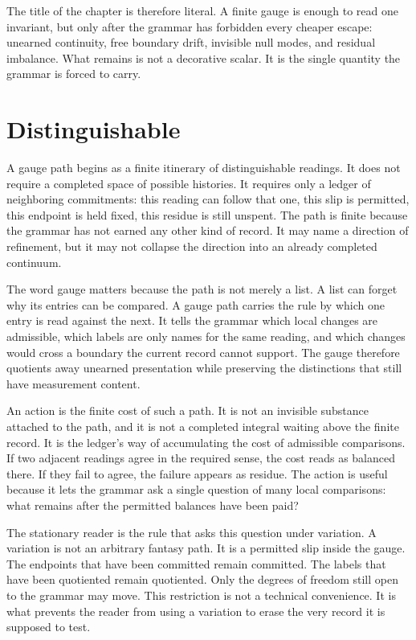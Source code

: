 The title of the chapter is therefore literal. A finite gauge is enough to
read one invariant, but only after the grammar has forbidden every cheaper
escape: unearned continuity, free boundary drift, invisible null modes, and
residual imbalance. What remains is not a decorative scalar. It is the
single quantity the grammar is forced to carry.

\section{Distinguishable}

A gauge path begins as a finite itinerary of distinguishable readings. It
does not require a completed space of possible histories. It requires only a
ledger of neighboring commitments: this reading can follow that one, this
slip is permitted, this endpoint is held fixed, this residue is still
unspent. The path is finite because the grammar has not earned any other
kind of record. It may name a direction of refinement, but it may not
collapse the direction into an already completed continuum.

The word gauge matters because the path is not merely a list. A list can
forget why its entries can be compared. A gauge path carries the rule by
which one entry is read against the next. It tells the grammar which local
changes are admissible, which labels are only names for the same reading,
and which changes would cross a boundary the current record cannot support.
The gauge therefore quotients away unearned presentation while preserving
the distinctions that still have measurement content.

An action is the finite cost of such a path. It is not an invisible
substance attached to the path, and it is not a completed integral waiting
above the finite record. It is the ledger's way of accumulating the cost of
admissible comparisons. If two adjacent readings agree in the required
sense, the cost reads as balanced there. If they fail to agree, the failure
appears as residue. The action is useful because it lets the grammar ask a
single question of many local comparisons: what remains after the permitted
balances have been paid?

The stationary reader is the rule that asks this question under variation.
A variation is not an arbitrary fantasy path. It is a permitted slip inside
the gauge. The endpoints that have been committed remain committed. The
labels that have been quotiented remain quotiented. Only the degrees of
freedom still open to the grammar may move. This restriction is not a
technical convenience. It is what prevents the reader from using a
variation to erase the very record it is supposed to test.

